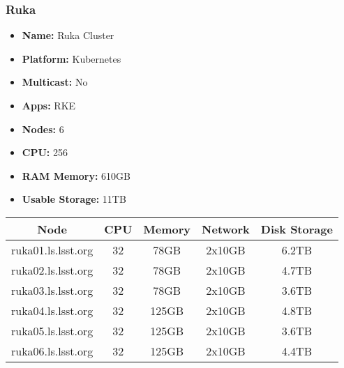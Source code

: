 \newpage
\subsubsection{Ruka}
\begin{itemize}
  \itemsep0em 
  \item \textbf{Name:}       Ruka Cluster
  \item \textbf{Platform:}   Kubernetes
  \item \textbf{Multicast:}  No
  \item \textbf{Apps:}       RKE
  \item \textbf{Nodes:}      6
  \item \textbf{CPU:}        256
  \item \textbf{RAM Memory:} 610GB
  \item \textbf{Usable Storage:}   11TB
\end{itemize}
\begin{center}
  \small
  \begin{tabular}{||c c c c c||}
    \hline
    \textbf{Node} & \textbf{CPU} & \textbf{Memory} & \textbf{Network} & \textbf{Disk Storage} \\ [0.5ex]
    \hline
    ruka01.ls.lsst.org & 32 & 78GB & 2x10GB & 6.2TB \\
    \hline
    ruka02.ls.lsst.org & 32 & 78GB & 2x10GB & 4.7TB \\
    \hline
    ruka03.ls.lsst.org & 32 & 78GB & 2x10GB & 3.6TB \\
    \hline
    ruka04.ls.lsst.org & 32 & 125GB & 2x10GB & 4.8TB \\
    \hline
    ruka05.ls.lsst.org & 32 & 125GB & 2x10GB & 3.6TB \\
    \hline
    ruka06.ls.lsst.org & 32 & 125GB & 2x10GB & 4.4TB \\
    \hline
  \end{tabular}
\end{center}

\newpage
